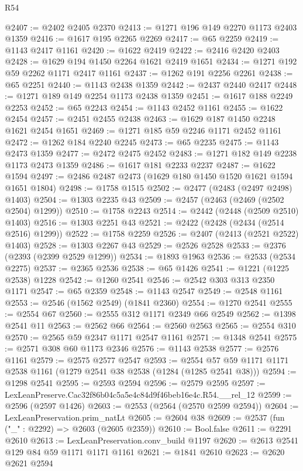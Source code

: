\begin{lexlean}{R54}
\begin{coremodule}
@2407 := @2402 @2405 @2370
@2413 := @1271 @196 @149 @2270 @1173 @2403 @1359
@2416 := @1617 @195 @2265 @2269
@2417 := @65 @2259
@2419 := @1143 @2417 @1161
@2420 := @1622 @2419
@2422 := @2416 @2420 @2403
@2428 := @1629 @194 @1450 @2264 @1621 @2419 @1651
@2434 := @1271 @192 @59 @2262 @1171 @2417 @1161
@2437 := @1262 @191 @2256 @2261
@2438 := @65 @2251
@2440 := @1143 @2438 @1359
@2442 := @2437 @2440 @2417
@2448 := @1271 @189 @149 @2254 @1173 @2438 @1359
@2451 := @1617 @188 @2249 @2253
@2452 := @65 @2243
@2454 := @1143 @2452 @1161
@2455 := @1622 @2454
@2457 := @2451 @2455 @2438
@2463 := @1629 @187 @1450 @2248 @1621 @2454 @1651
@2469 := @1271 @185 @59 @2246 @1171 @2452 @1161
@2472 := @1262 @184 @2240 @2245
@2473 := @65 @2235
@2475 := @1143 @2473 @1359
@2477 := @2472 @2475 @2452
@2483 := @1271 @182 @149 @2238 @1173 @2473 @1359
@2486 := @1617 @181 @2233 @2237
@2487 := @1622 @1594
@2497 := @2486 @2487 @2473 (@1629 @180 @1450 @1520 @1621 @1594 @1651 @1804)
@2498 := @1758 @1515
@2502 := @2477 (@2483 (@2497 @2498) @1403)
@2504 := @1303 @2235 @43
@2509 := @2457 (@2463 (@2469 (@2502 @2504) @1299))
@2510 := @1758 @2243
@2514 := @2442 (@2448 (@2509 @2510) @1403)
@2516 := @1303 @2251 @43
@2521 := @2422 (@2428 (@2434 (@2514 @2516) @1299))
@2522 := @1758 @2259
@2526 := @2407 (@2413 (@2521 @2522) @1403)
@2528 := @1303 @2267 @43
@2529 := @2526 @2528
@2533 := @2376 (@2393 (@2399 @2529 @1299))
@2534 := @1893 @1963
@2536 := @2533 (@2534 @2275)
@2537 := @2365 @2536
@2538 := @65 @1426
@2541 := @1221 (@1225 @2538) @1228
@2542 := @1260 @2541
@2546 := @2542 @303 @313 @2350 @1171
@2547 := @65 @2359
@2548 := @1143 @2547
@2549 := @2548 @1161
@2553 := @2546 (@1562 @2549) (@1841 @2360)
@2554 := @1270 @2541
@2555 := @2554 @67
@2560 := @2555 @312 @1171 @2349 @66 @2549
@2562 := @1398 @2541 @11
@2563 := @2562 @66
@2564 := @2560 @2563
@2565 := @2554 @310
@2570 := @2565 @59 @2347 @1171 @2547 @1161
@2571 := @1348 @2541
@2575 := @2571 @308 @60 @1173 @2346
@2576 := @1143 @2538
@2577 := @2576 @1161
@2579 := @2575 @2577 @2547
@2593 := @2554 @57 @59 @1171 @1171 @2538 @1161 (@1279 @2541 @38 @2538 (@1284 (@1285 @2541 @38)))
@2594 := @1298 @2541
@2595 := @2593 @2594
@2596 := @2579 @2595
@2597 := LexLeanPreserve.Cac32f86b04c5a5e4c84d9f46beb16e4c.R54.__rel_12
@2599 := @2596 (@2597 @1426)
@2603 := @2553 (@2564 (@2570 @2599 @2594))
@2604 := LexLeanPreservation.prim_natLt
@2605 := @2604 @38
@2609 := @2537 (fun ("_" : @2292) => @2603 (@2605 @2359))
@2610 := Bool.false
@2611 := @2291 @2610
@2613 := LexLeanPreservation.conv_build @1197
@2620 := @2613 @2541 @129 @84 @59 @1171 @1171 @1161
@2621 := @1841 @2610
@2623 := @2620 @2621 @2594

\end{coremodule}
\end{lexlean}
